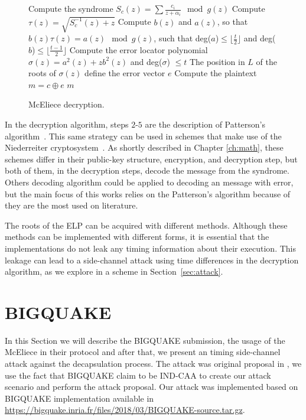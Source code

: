 \begin{figure}
\centering
    \begin{algorithm}[H]
     Compute the syndrome $S_c(z) = \sum{\frac{c_i}{z+\alpha_i}} \mod g(z)$\;
     Compute $\tau(z) = \sqrt{S^{-1}_{c}(z)+z}$\;
     Compute $b(z)$ and $a(z)$, so that $b(z)\tau(z) = a(z) \mod g(z)$, such that deg($a$)$\leq \lfloor \frac{t}{2} \rfloor$ and deg($b$)$\leq \lfloor \frac{t-1}{2} \rfloor$\;
     Compute the error locator polynomial $\sigma(z) = a^2(z) + zb^2(z)$ and deg($\sigma$) $\leq t$\;
     The position in $L$ of the roots of $\sigma(z)$ define the error vector $e$\;
     Compute the plaintext $m = c \oplus e$\;
     \Return $m$\;
     \caption{McEliece decryption.}\label{alg:3}
    \end{algorithm}
\end{figure}


In the decryption algorithm, steps $2$-$5$ are the description of Patterson's algorithm~\cite{patterson1975algebraic}. This same strategy can be used in schemes that make use of the Niederreiter cryptosystem~\cite{niederreiter}. As shortly described in Chapter \ref{ch:math}, these schemes differ in their public-key structure, encryption, and decryption step, but both of them, in the decryption steps, decode the message from the syndrome. Others decoding algorithm could be applied to decoding an message with error, but the main focus of this works relies on the Patterson's algorithm because of they are the most used on literature. 

The roots of the ELP can be acquired with different methods. Although these methods can be implemented with different forms, it is essential that the implementations do not leak any timing information about their execution. This leakage can lead to a side-channel attack using time differences in the decryption algorithm, as we explore in a scheme in Section~\ref{sec:attack}.

\section{BIGQUAKE}
In this Section we will describe the BIGQUAKE submission, the usage of the McEliece in their protocol and after that, we present an timing side-channel attack against the decapsulation process. The attack was original proposal in \cite{shoufan2009timing}, we use the fact that BIGQUAKE claim to be IND-CAA to create our attack scenario and perform the attack proposal. Our attack was implemented based on BIGQUAKE implementation available in \url{https://bigquake.inria.fr/files/2018/03/BIGQUAKE-source.tar.gz}.

